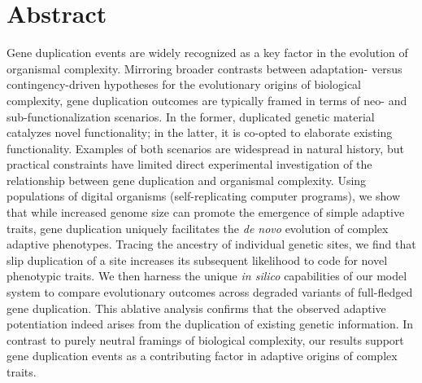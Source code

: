\section*{Abstract}

Gene duplication events are widely recognized as a key factor in the evolution of organismal complexity.
Mirroring broader contrasts between adaptation- versus contingency-driven hypotheses for the evolutionary origins of biological complexity, gene duplication outcomes are typically framed in terms of neo- and sub-functionalization scenarios.
In the former, duplicated genetic material catalyzes novel functionality; in the latter, it is co-opted to elaborate existing functionality.
Examples of both scenarios are widespread in natural history, but practical constraints have limited direct experimental investigation of the relationship between gene duplication and organismal complexity.
Using populations of digital organisms (self-replicating computer programs), we show that while increased genome size can promote the emergence of simple adaptive traits, gene duplication uniquely facilitates the \textit{de novo} evolution of complex adaptive phenotypes.
Tracing the ancestry of individual genetic sites, we find that slip duplication of a site increases its subsequent likelihood to code for novel phenotypic traits.
We then harness the unique \textit{in silico} capabilities of our model system to compare evolutionary outcomes across degraded variants of full-fledged gene duplication.
This ablative analysis confirms that the observed adaptive potentiation indeed arises from the duplication of existing genetic information.
In contrast to purely neutral framings of biological complexity, our results support gene duplication events as a contributing factor in adaptive origins of complex traits.
